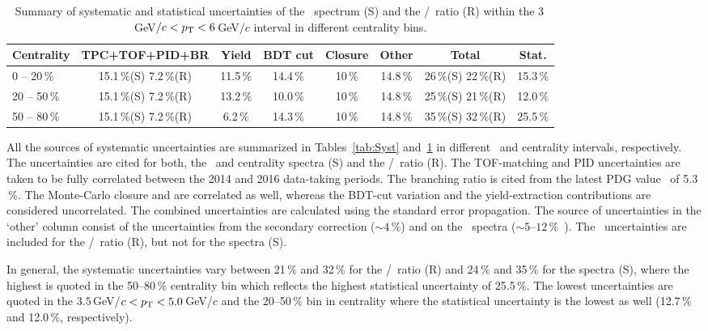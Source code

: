 \begin{table}[!htb]
\caption[Summary of systematic and statistical uncertainties of the \Lambdac\ spectrum and the \Lambdac/\dzero\ ratio in different centrality bins.]{\label{tab:SystCent} Summary of systematic and statistical uncertainties of the \Lambdac\ spectrum (S) and the \Lambdac/\dzero\ ratio (R) within the 3$\,$GeV$/c < {p_{\mathrm{T}}} < 6\,$GeV$/c$ interval in different centrality bins.}

\hspace{-6ex}\begin{tabular}{lccccccc}
\toprule
Centrality & TPC+TOF+PID+BR & Yield & BDT cut & Closure & Other & Total & Stat.\\
\midrule
0  -- 20$\,\%$ & 15.1$\,\%$(S)  7.2$\,\%$(R) & 11.5$\,\%$ &14.4$\,\%$ &10$\,\%$ &14.8$\,\%$ & 26$\,\%$(S)  22$\,\%$(R) & 15.3$\,\%$ \\
20 -- 50$\,\%$ & 15.1$\,\%$(S)  7.2$\,\%$(R) & 13.2$\,\%$ &10.0$\,\%$ &10$\,\%$ &14.8$\,\%$ & 25$\,\%$(S)  21$\,\%$(R) & 12.0$\,\%$ \\
50 -- 80$\,\%$ & 15.1$\,\%$(S)  7.2$\,\%$(R) &  6.2$\,\%$ &14.3$\,\%$ &10$\,\%$ &14.8$\,\%$ & 35$\,\%$(S)  32$\,\%$(R) & 25.5$\,\%$ \\

\bottomrule
\end{tabular}
\end{table}

All the sources of systematic uncertainties are summarized in Tables~\ref{tab:Syst} and~\ref{tab:SystCent} in different \pt\ and centrality intervals, respectively. The uncertainties are cited for both, the \pt\ and centrality spectra (S) and the \Lambdac/\dzero\ ratio (R)\@. The TOF-matching and PID uncertainties are taken to be fully correlated between the 2014 and 2016 data-taking periods. The branching ratio is cited from the latest PDG value~\cite{PDG} of 5.3$\,\%$\@. The Monte-Carlo closure and are correlated as well, whereas the BDT-cut variation and the yield-extraction contributions are considered uncorrelated. The combined uncertainties are calculated using the standard error propagation. The source of uncertainties in the `other' column consist of the uncertainties from the secondary correction ($\sim4\,\%$) and on the \dzero\ spectra ($\sim5$--$12\,\%$~\cite{D0paper})\@. The \dzero\ uncertainties are included for the \Lambdac/\dzero\ ratio (R), but not for the spectra (S)\@.

In general, the systematic uncertainties vary between 21$\,\%$ and 32$\,\%$ for the \Lambdac/\dzero\ ratio (R) and 24$\,\%$ and 35$\,\%$ for the spectra (S), where the highest is quoted in the 50--80$\,\%$ centrality bin which reflects the highest statistical uncertainty of 25.5$\,\%$\@. The lowest uncertainties are quoted in the $3.5\,$GeV/$c < {p_{\mathrm{T}}} < 5.0\,$GeV/$c$ and the 20--50$\,\%$ bin in centrality where the statistical uncertainty is the lowest as well (12.7$\,\%$ and 12.0$\,\%$, respectively).






